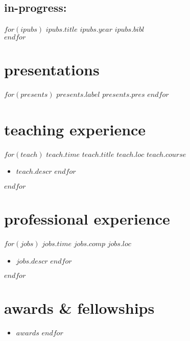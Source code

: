 \documentclass[]{friggeri-cv}
\begin{document}
\subsection{in-progress:}
\begin{entrylist}
$for(ipubs)$
  \entrypub
  {$ipubs.title$}
  {$ipubs.year$}
  {$ipubs.bibl$}\\
$endfor$
\end{entrylist}



\section{presentations}
\begin{entrylist}
$for(presents)$
  \entry
  {$presents.label$}
  {}
  {}
  {$presents.pres$}
$endfor$
\end{entrylist}



\section{teaching experience}
\begin{entrylist}
$for(teach)$
  \entry
  {$teach.time$}
  {$teach.title$}
  {$teach.loc$}
  {$teach.course$}
  \setlength\parskip{0pt}
  \begin{itemize}[noitemsep, leftmargin=0.2in]
    $for(teach.descr)$
      \item $teach.descr$
    $endfor$
  \end{itemize}
  \setlength\parskip{12pt}
$endfor$
\end{entrylist}

\section{professional experience}
\begin{entrylist}
$for(jobs)$
  \entryalt
  {$jobs.time$}
  {$jobs.comp$}
  {$jobs.loc$}
  \setlength\parskip{0pt}
  \begin{itemize}[noitemsep, leftmargin=0.2in]
    $for(jobs.descr)$
      \item $jobs.descr$
    $endfor$
  \end{itemize}
  \setlength\parskip{12pt}
$endfor$
\end{entrylist}



\section{awards \& fellowships}
\begin{itemize}[noitemsep, leftmargin=0.55in]
$for(awards)$
  \item $awards$
$endfor$
\end{itemize}
\end{document}
